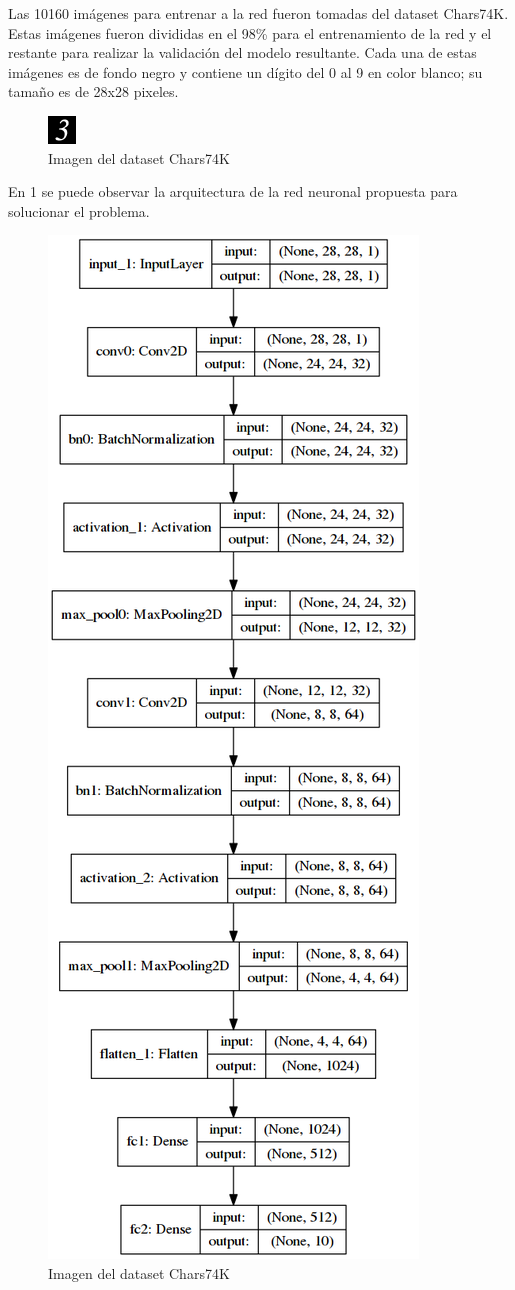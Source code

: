 \documentclass{article}
\begin{document}
Las 10160 im\'agenes para entrenar a la red fueron tomadas del dataset Chars74K. Estas im\'agenes fueron divididas en el 98\% para el entrenamiento de la red y el restante para realizar la validaci\'on del modelo resultante. Cada una de estas im\'agenes es de fondo negro y contiene un d\'igito del 0 al 9 en color blanco; su tama\~no es de 28x28 pixeles.
\begin{figure}[H]
  \caption{Imagen del dataset Chars74K}
  \centering
  \includegraphics[]{dtimgexample}
\end{figure}

En 1 se puede observar la arquitectura de la red neuronal propuesta para solucionar el problema.
\begin{figure}[H]
  \caption{Imagen del dataset Chars74K}
  \centering
  \includegraphics[scale=.40]{model_plot}

\end{figure}
\end{document}

